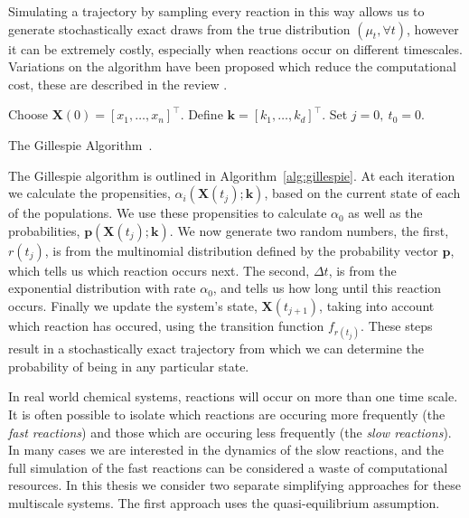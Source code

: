 \documentclass[final]{siamltex}
\begin{document}
Simulating a trajectory by sampling every reaction in this way allows us to generate stochastically exact draws from the true distribution $(\mu_t, \forall t)$, however it can be extremely costly, especially when reactions occur on different timescales. Variations on the algorithm have been proposed which reduce the computational cost, these are described in the review \cite{gillespie2007stochastic}.

\begin{table}[!htpb]
\centering
\begin{algorithm}[H]
\DontPrintSemicolon
\BlankLine
	Choose $\mathbf{X}(0) = [x_1, \ldots, x_n]^\top$.\;
	Define $\mathbf{k} = [k_1, \ldots, k_d]^\top$.\;
	Set $j= 0,\ t_0 = 0$.\;
\caption{The Gillespie Algorithm~\cite{gillespie2007stochastic}.\label{alg:gillespie}}
\end{algorithm}
\end{table}

The Gillespie algorithm is outlined in Algorithm~\ref{alg:gillespie}. At each iteration we calculate the propensities, $\alpha_i(\mathbf{X}(t_j);\mathbf{k})$, based on the current state of each of the populations. We use these propensities to calculate $\alpha_0$ as well as the probabilities, $\mathbf{p}(\mathbf{X}(t_j); \mathbf{k})$. We now generate two random numbers, the first, $r(t_j)$, is from the multinomial distribution defined by the probability vector $\mathbf{p}$, which tells us which reaction occurs next. The second, $\Delta t$, is from the exponential distribution with rate $\alpha_0$, and tells us how long until this reaction occurs. Finally we update the system's state, $\mathbf{X}(t_{j+1})$, taking into account which reaction has occured, using the transition function $f_{r(t_j)}$. These steps result in a stochastically exact trajectory from which we can determine the probability of being in any particular state.


In real world chemical systems, reactions will occur on more than one time scale. It is often possible to isolate which reactions are occuring more frequently (the \textit{fast reactions}) and those which are occuring less frequently (the \textit{slow reactions}). In many cases we are interested in the dynamics of the slow reactions, and the full simulation of the fast reactions can be considered a waste of computational resources. In this thesis we consider two separate simplifying approaches for these multiscale systems. The first approach uses the quasi-equilibrium assumption.
\end{document}
